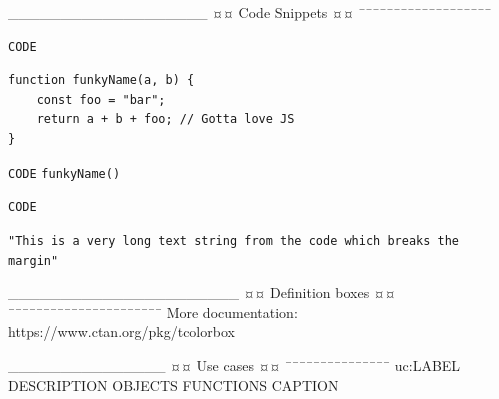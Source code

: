 

___________________
¤¤ Code Snippets ¤¤
¯¯¯¯¯¯¯¯¯¯¯¯¯¯¯¯¯¯¯
\begin{lstlisting}[language=LANGUAGENAME, caption={CAPTION}, captionpos=b, label={snip:LABEL}]
CODE
\end{lstlisting}
\begin{lstlisting}[language=JS, caption={Example of function \texttt{funkyName(a, b)}}, captionpos=b, label={snip:funkyfunc}]
function funkyName(a, b) {
    const foo = "bar";
    return a + b + foo; // Gotta love JS
}
\end{lstlisting}

\texttt{CODE}
\texttt{funkyName()}

\begin{sloppy}
    \texttt{CODE}
\end{sloppy}
\begin{sloppy}
    \texttt{"This is a very long text string from the code which breaks the margin"}
\end{sloppy}

______________________
¤¤ Definition boxes ¤¤
¯¯¯¯¯¯¯¯¯¯¯¯¯¯¯¯¯¯¯¯¯¯
More documentation: https://www.ctan.org/pkg/tcolorbox


_______________
¤¤ Use cases ¤¤
¯¯¯¯¯¯¯¯¯¯¯¯¯¯¯
        {uc:LABEL}
        {DESCRIPTION}
        {OBJECTS}
        {FUNCTIONS}
        {CAPTION}

